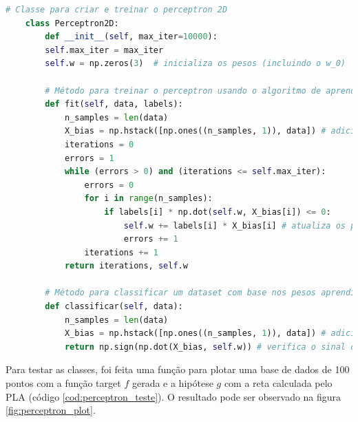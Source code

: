\begin{lstlisting}[language=Python, caption=Perceptron, label=cod:perceptron]
    # Classe para criar e treinar o perceptron 2D
    class Perceptron2D:
        def __init__(self, max_iter=10000):
        self.max_iter = max_iter
        self.w = np.zeros(3)  # inicializa os pesos (incluindo o w_0)

        # Método para treinar o perceptron usando o algoritmo de aprendizagem perceptron (PLA)
        def fit(self, data, labels): 
            n_samples = len(data)
            X_bias = np.hstack([np.ones((n_samples, 1)), data]) # adiciona uma coluna de 1s para o X_0 (coordenada artificial)
            iterations = 0
            errors = 1
            while (errors > 0) and (iterations <= self.max_iter):
                errors = 0
                for i in range(n_samples):
                    if labels[i] * np.dot(self.w, X_bias[i]) <= 0:
                        self.w += labels[i] * X_bias[i] # atualiza os pesos
                        errors += 1
                iterations += 1
            return iterations, self.w

        # Método para classificar um dataset com base nos pesos aprendidos.
        def classificar(self, data):
            n_samples = len(data)
            X_bias = np.hstack([np.ones((n_samples, 1)), data]) # adiciona uma coluna de 1s para o bias X_0
            return np.sign(np.dot(X_bias, self.w)) # verifica o sinal do produto escalar entre x e w
\end{lstlisting}


Para testar as classes, foi feita uma função para plotar uma base de dados de 100 pontos com a função target $f$ gerada e a hipótese $g$ com a reta calculada pelo PLA (código \ref{cod:perceptron_teste}). O resultado pode ser observado na figura \ref{fig:perceptron_plot}. 

